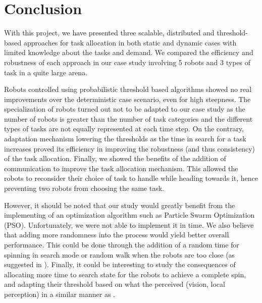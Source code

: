 \section{Conclusion}
With this project, we have presented three scalable, distributed and threshold-based approaches for task allocation in both static and dynamic cases with limited knowledge about the tasks and demand. We compared the efficiency and robustness of each approach in our case study involving 5 robots and 3 types of task in a quite large arena.

Robots controlled using probabilistic threshold based algorithms showed no real improvements over the deterministic case scenario, even for high steepness. The specialization of robots turned out not to be adapted to our case study as the number of robots is greater than the number of task categories and the different types of tasks are not equally represented at each time step. On the contrary, adaptation mechanism lowering the thresholds as the time in search for a task increases proved its efficiency in improving the robustness (and thus consistency) of the task allocation. Finally, we showed the benefits of the addition of communication to improve the task allocation mechanism. This allowed the robots to reconsider their choice of task to handle while heading towards it, hence preventing two robots from choosing the same task.

However, it should be noted that our study would greatly benefit from the implementing of an optimization algorithm such as Particle Swarm Optimization (PSO). Unfortunately, we were not able to implement it in time. We also believe that adding more randomness into the process would yield better overall performance. This could be done through the addition of a random time for spinning in search mode or random walk when the robots are too close (as suggested in \cite{3}). Finally, it could be interesting to study the consequences of allocating more time to search state for the robots to achieve a complete spin, and adapting their threshold based on what the perceived (vision, local perception) in a similar manner as \cite{3}.
